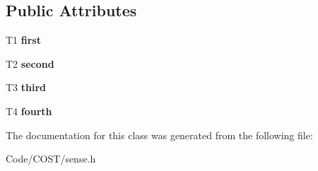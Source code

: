 \subsection*{Public Attributes}
\begin{DoxyCompactItemize}
\item 
\mbox{\label{classQuadruple_aa648264ed0b022474fc2f28e3ff2c1dd}} 
T1 {\bfseries first}
\item 
\mbox{\label{classQuadruple_a7a7aa3970b1cafef2576b81e2dea3653}} 
T2 {\bfseries second}
\item 
\mbox{\label{classQuadruple_ac5cb735e12bd7a9ff48c79514d065de0}} 
T3 {\bfseries third}
\item 
\mbox{\label{classQuadruple_a5fdc9eecd954f3b36481e77ac2d57039}} 
T4 {\bfseries fourth}
\end{DoxyCompactItemize}


The documentation for this class was generated from the following file\+:\begin{DoxyCompactItemize}
\item 
Code/\+C\+O\+S\+T/sense.\+h\end{DoxyCompactItemize}
